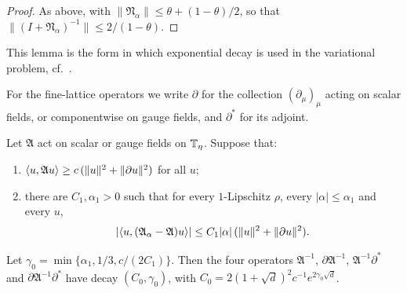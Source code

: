 \begin{proof}
As above, with $\|\mathfrak N_\alpha\|\le\theta+(1-\theta)/2$, so that $\|(I+\mathfrak N_\alpha)^{-1}\|\le2/(1-\theta)$.
\end{proof}

This lemma is the form in which exponential decay is used in the variational problem, cf.\ \cite[(68)--(71)]{BalVar}.

For the fine-lattice operators we write $\partial$ for the collection $(\partial_\mu)_\mu$ acting on scalar fields, or componentwise on gauge fields, and $\partial^*$ for its adjoint.

\begin{lemma}\label{lem:CT-form}
Let $\mathfrak A$ act on scalar or gauge fields on $\mathbb T_\eta$. Suppose that:
\begin{enumerate}[label=(\roman*)]
\item $\langle u,\mathfrak Au\rangle\ge c\,(\|u\|^2+\|\partial u\|^2)$ for all $u$;
\item there are $C_1,\alpha_1>0$ such that for every $1$-Lipschitz $\rho$, every $|\alpha|\le\alpha_1$ and every $u$,
\[
|\langle u,(\mathfrak A_\alpha-\mathfrak A)u\rangle|\le C_1|\alpha|\,(\|u\|^2+\|\partial u\|^2).
\]
\end{enumerate}
Let $\gamma_0=\min\{\alpha_1,1/3,c/(2C_1)\}$. Then the four operators $\mathfrak A^{-1}$, $\partial\mathfrak A^{-1}$, $\mathfrak A^{-1}\partial^*$ and $\partial\mathfrak A^{-1}\partial^*$ have decay $(C_0,\gamma_0)$, with $C_0=2(1+\sqrt d)^2c^{-1}e^{2\gamma_0\sqrt d}$.
\end{lemma}

